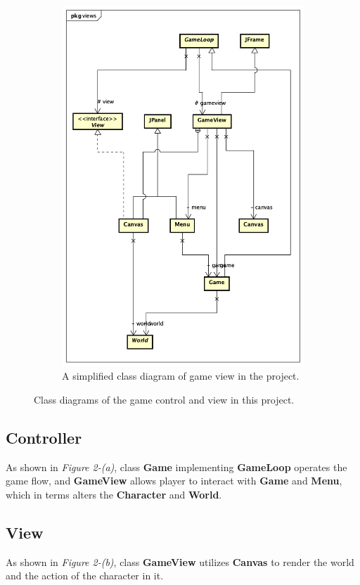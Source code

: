 \begin{figure}[h!]
\begin{subfigure}{.5\textwidth}
  \includegraphics[width=.9\linewidth]{View_Class_Diagram}  
  \caption{A simplified class diagram of game view in the project.}
  \label{fig:sub-second}
\end{subfigure}
\caption{Class diagrams of the game control and view in this project.}
\end{figure}

\subsection{Controller}
As shown in \textit{Figure 2-(a)}, class \textbf{Game} implementing \textbf{GameLoop} operates the game flow, and \textbf{GameView} allows player to interact with \textbf{Game} and \textbf{Menu}, which in terms alters the \textbf{Character} and \textbf{World}.

\subsection{View}
As shown in \textit{Figure 2-(b)}, class \textbf{GameView} utilizes \textbf{Canvas} to render the world and the action of the character in it.
\newpage